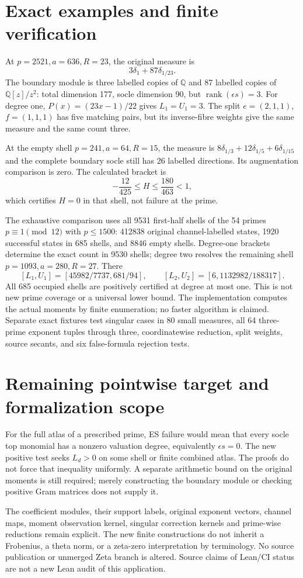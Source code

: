 \section{Exact examples and finite verification}
At $p=2521,a=636,R=23$, the original measure is
\[
 3\delta_1+87\delta_{1/23}.
\]
The boundary module is three labelled copies of $\mathbb Q$ and 87 labelled
copies of $\mathbb Q[z]/z^2$: total dimension 177, socle dimension 90,
but $\operatorname{rank}(\epsilon s)=3$. For degree one,
$P(x)=(23x-1)/22$ gives $L_1=U_1=3$. The split $e=(2,1,1)$,
$f=(1,1,1)$ has five matching pairs, but its inverse-fibre weights give the
same measure and the same count three.

At the empty shell $p=241,a=64,R=15$, the measure is
$8\delta_{1/3}+12\delta_{1/5}+6\delta_{1/15}$ and the complete boundary socle
still has 26 labelled directions. Its augmentation comparison is zero.
The calculated bracket is
\[
 \boxed{-\frac{12}{425}\le H\le\frac{180}{463}<1,}
\]
which certifies $H=0$ in that shell, not failure at the prime.

The exhaustive comparison uses all 9531 first-half shells of the 54 primes
$p\equiv1\pmod{12}$ with $p\le1500$: 412838 original channel-labelled states,
1920 successful states in 685 shells, and 8846 empty shells. Degree-one
brackets determine the exact count in 9530 shells; degree two resolves the
remaining shell $p=1093,a=280,R=27$. There
\[
 [L_1,U_1]=[45982/7737,681/94],\qquad
 [L_2,U_2]=[6,1132982/188317].
\]
All 685 occupied shells are positively certified at degree at most one.
This is not new prime coverage or a universal lower bound. The implementation
computes the actual moments by finite enumeration; no faster algorithm is
claimed. Separate exact fixtures test singular cases in 80 small measures,
all 64 three-prime exponent tuples through three, coordinatewise reduction,
split weights, source secants, and six false-formula rejection tests.

\section{Remaining pointwise target and formalization scope}
For the full atlas of a prescribed prime, ES failure would mean that every
socle top monomial has a nonzero valuation degree, equivalently $\epsilon s=0$.
The new positive test seeks $L_d>0$ on some shell or finite combined atlas.
The proofs do not force that inequality uniformly. A separate arithmetic
bound on the original moments is still required; merely constructing the
boundary module or checking positive Gram matrices does not supply it.

The coefficient modules, their support labels, original exponent vectors,
channel maps, moment observation kernel, singular correction kernels and
prime-wise reductions remain explicit. The new finite constructions do not
inherit a Frobenius, a theta norm, or a zeta-zero interpretation by terminology.
No source publication or unmerged Zeta branch is altered. Source claims of
Lean/CI status are not a new Lean audit of this application.

